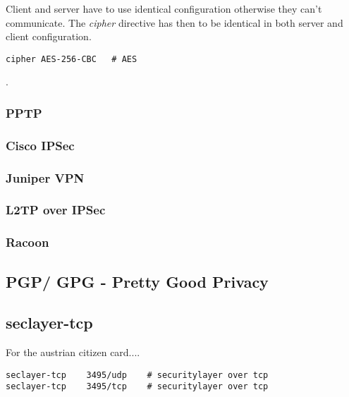 Client and server have to use identical configuration otherwise they can't communicate.
The {\it cipher} directive has then to be identical in both server and client configuration.

\begin{lstlisting}[breaklines]
cipher AES-256-CBC   # AES
\end{lstlisting}

. 

\subsubsection{PPTP}

\subsubsection{Cisco IPSec}

\subsubsection{Juniper VPN}

\subsubsection{L2TP over IPSec}

\subsubsection{Racoon}


\subsection{PGP/ GPG - Pretty Good Privacy}



\subsection{seclayer-tcp}
For the austrian citizen card....

\begin{verbatim}
seclayer-tcp    3495/udp    # securitylayer over tcp
seclayer-tcp    3495/tcp    # securitylayer over tcp
\end{verbatim}


